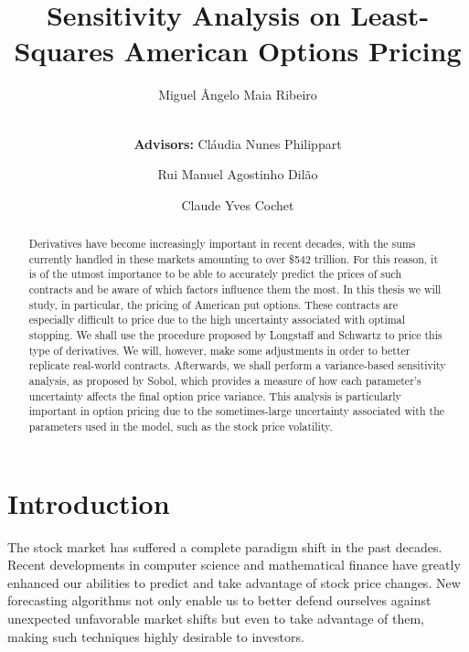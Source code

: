 \documentclass[a4paper,twocolumn,aps,prd,longbibliography,superscriptaddress]{revtex4-1}
\begin{document}
\title{Sensitivity Analysis on Least-Squares American Options Pricing}

\author{Miguel Ângelo Maia Ribeiro}

\author{\\[0.3cm]\small{\textbf{Advisors:} Cláudia Nunes Philippart}}
\author{\small{Rui Manuel Agostinho Dilão}}
\author{\small{Claude Yves Cochet}}


\begin{abstract}
Derivatives have become increasingly important in recent decades, with the sums currently handled in these markets amounting to over \$542 trillion.
For this reason, it is of the utmost importance to be able to accurately predict the prices of such contracts and be aware of which factors influence them the most.
In this thesis we will study, in particular, the pricing of American put options. These contracts are especially difficult to price due to the high uncertainty associated with optimal stopping.
We shall use the procedure proposed by Longstaff and Schwartz to price this type of derivatives. We will, however, make some adjustments in order to better replicate real-world contracts.
Afterwards, we shall perform a variance-based sensitivity analysis, as proposed by Sobol, which provides a measure of how each parameter's uncertainty affects the final option price variance.
This analysis is particularly important in option pricing due to the sometimes-large uncertainty associated with the parameters used in the model, such as the stock price volatility.
\end{abstract}

\maketitle
\section{Introduction}
The stock market has suffered a complete paradigm shift in the past decades. Recent developments in computer science and mathematical finance have greatly enhanced our abilities to predict and take advantage of stock price changes. New forecasting algorithms not only enable us to better defend ourselves against unexpected unfavorable market shifts but even to take advantage of them, making such techniques highly desirable to investors.
\end{document}
